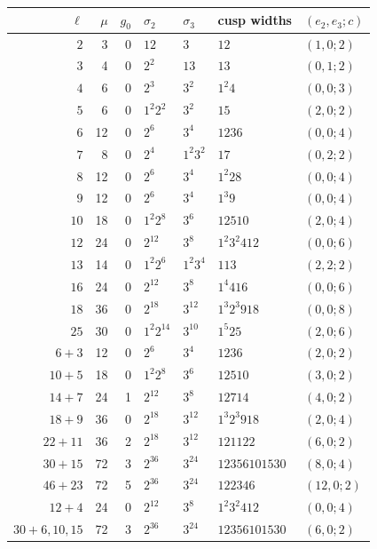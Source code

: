 \begin{longtable}{r|r|r|l|l|l|l}
$\ell$ & $\mu$ & $g_0$ & $\sigma_2$ & $\sigma_3$ & cusp widths & $(e_2,e_3;c)$\\\hline
$2$ & 3 & 0 & $1 2$ & $3$ & $1 2$ & $(1,0;2)$\\
$3$ & 4 & 0 & $2^{2}$ & $1 3$ & $1 3$ & $(0,1;2)$\\
$4$ & 6 & 0 & $2^{3}$ & $3^{2}$ & $1^{2} 4$ & $(0,0;3)$\\
$5$ & 6 & 0 & $1^{2} 2^{2}$ & $3^{2}$ & $1 5$ & $(2,0;2)$\\
$6$ & 12 & 0 & $2^{6}$ & $3^{4}$ & $1 2 3 6$ & $(0,0;4)$\\
$7$ & 8 & 0 & $2^{4}$ & $1^{2} 3^{2}$ & $1 7$ & $(0,2;2)$\\
$8$ & 12 & 0 & $2^{6}$ & $3^{4}$ & $1^{2} 2 8$ & $(0,0;4)$\\
$9$ & 12 & 0 & $2^{6}$ & $3^{4}$ & $1^{3} 9$ & $(0,0;4)$\\
$10$ & 18 & 0 & $1^{2} 2^{8}$ & $3^{6}$ & $1 2 5 10$ & $(2,0;4)$\\
$12$ & 24 & 0 & $2^{12}$ & $3^{8}$ & $1^{2} 3^{2} 4 12$ & $(0,0;6)$\\
$13$ & 14 & 0 & $1^{2} 2^{6}$ & $1^{2} 3^{4}$ & $1 13$ & $(2,2;2)$\\
$16$ & 24 & 0 & $2^{12}$ & $3^{8}$ & $1^{4} 4 16$ & $(0,0;6)$\\
$18$ & 36 & 0 & $2^{18}$ & $3^{12}$ & $1^{3} 2^{3} 9 18$ & $(0,0;8)$\\
$25$ & 30 & 0 & $1^{2} 2^{14}$ & $3^{10}$ & $1^{5} 25$ & $(2,0;6)$\\
$6+3$ & 12 & 0 & $2^{6}$ & $3^{4}$ & $1 2 3 6$ & $(2,0;2)$\\
$10+5$ & 18 & 0 & $1^{2} 2^{8}$ & $3^{6}$ & $1 2 5 10$ & $(3,0;2)$\\
$14+7$ & 24 & 1 & $2^{12}$ & $3^{8}$ & $1 2 7 14$ & $(4,0;2)$\\
$18+9$ & 36 & 0 & $2^{18}$ & $3^{12}$ & $1^{3} 2^{3} 9 18$ & $(2,0;4)$\\
$22+11$ & 36 & 2 & $2^{18}$ & $3^{12}$ & $1 2 11 22$ & $(6,0;2)$\\
$30+15$ & 72 & 3 & $2^{36}$ & $3^{24}$ & $1 2 3 5 6 10 15 30$ & $(8,0;4)$\\
$46+23$ & 72 & 5 & $2^{36}$ & $3^{24}$ & $1 2 23 46$ & $(12,0;2)$\\
$12+4$ & 24 & 0 & $2^{12}$ & $3^{8}$ & $1^{2} 3^{2} 4 12$ & $(0,0;4)$\\
$30+6,10,15$ & 72 & 3 & $2^{36}$ & $3^{24}$ & $1 2 3 5 6 10 15 30$ & $(6,0;2)$\\
\end{longtable}
